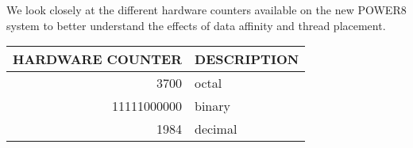 We look closely at the different hardware counters available on the new POWER8 system to better understand the effects of data affinity and thread placement. \\

 \centering
\begin{tabular}{|r|l|}
  \hline
  \textbf{HARDWARE COUNTER} & {DESCRIPTION} \\
   \hline
  3700 & octal \\
   \hline
  11111000000 & binary \\
  \hline
  1984 & decimal \\
  \hline
\end{tabular}
\\